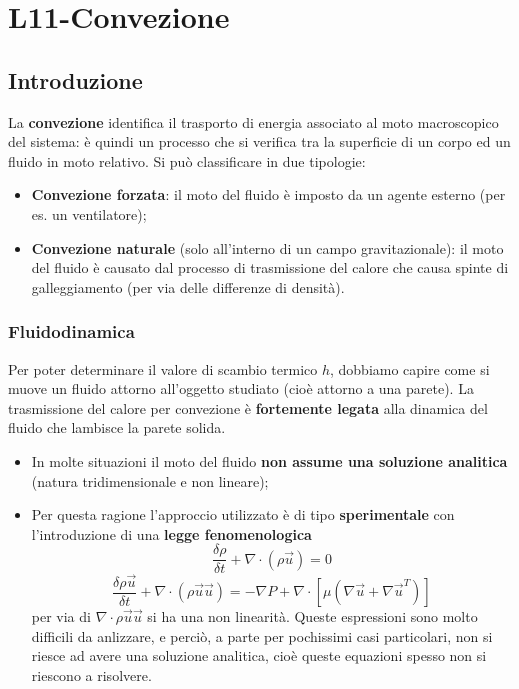 \section{L11-Convezione}
\subsection{Introduzione}
La \textbf{convezione} identifica il trasporto di energia associato al
moto macroscopico del sistema: è quindi un processo che si
verifica tra la superficie di un corpo ed un fluido in moto
relativo.\newline
Si può classificare in due tipologie:
\begin{itemize}
    \item \textbf{Convezione forzata}: il moto del fluido è imposto da un agente esterno (per es. un ventilatore);
    \item \textbf{Convezione naturale} (solo all'interno di un campo gravitazionale): il moto del fluido è causato dal processo di trasmissione del calore che causa spinte di galleggiamento (per via delle differenze di densità).
\end{itemize}
\subsubsection{Fluidodinamica}
Per poter determinare il valore di scambio termico $h$, dobbiamo capire come si muove un fluido attorno all'oggetto studiato (cioè attorno a una parete).\newline
\newline
La trasmissione del calore per convezione è \textbf{fortemente legata} alla dinamica del
fluido che lambisce la parete solida.
\begin{itemize}
    \item In molte situazioni il moto del fluido \textbf{non assume una soluzione analitica}
    (natura tridimensionale e non lineare);
    \item Per questa ragione l’approccio utilizzato è di tipo \textbf{sperimentale} con
    l’introduzione di una \textbf{legge fenomenologica}
    \[
        \frac{\delta \rho}{\delta t} + \nabla \cdot (\rho \vec{u}) = 0
    \]
    \[
        \frac{\delta \rho \vec{u}}{\delta t} + \nabla \cdot  (\rho \vec{u} \vec{u}) = - \nabla P + \nabla \cdot \left[\mu \left(\nabla \vec{u} + \nabla \vec{u}^T\right)\right]
    \]
    per via di $ \nabla \cdot \rho \vec{u} \vec{u}$ si ha una non linearità. Queste espressioni sono molto difficili da anlizzare, e perciò, a parte per pochissimi casi particolari, non si riesce ad avere una soluzione analitica, cioè queste equazioni spesso non si riescono a risolvere.
\end{itemize}
